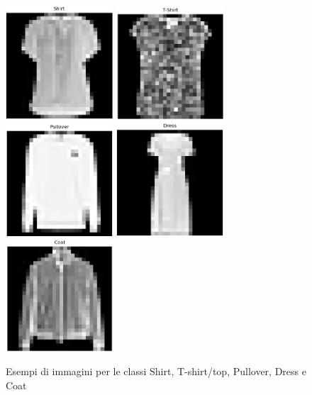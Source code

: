 \begin{figure}[!hbt]
\centering
\includegraphics[width=4cm]{images/shirt6bis.png}
\includegraphics[width=4cm]{images/tshirt0bis.png}
\includegraphics[width=4cm]{images/pullover2bis.png}
\includegraphics[width=4cm]{images/dress3bis.png}
\includegraphics[width=4cm]{images/coat4bis.png}
\caption{Esempi di immagini per le classi Shirt, T-shirt/top, Pullover, Dress e Coat}
\label{fig12:abiti_example}
\end{figure}
